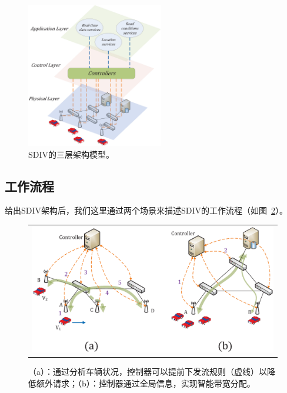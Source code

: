 \begin{figure} [t]
\begin{center}
\includegraphics[width=0.9\columnwidth,height=2.5in]{figures/fig-2-24.eps}
\vspace{-0.2in}
\caption{SDIV的三层架构模型。} \label{fig2}
\end{center}
\vspace{-0.3in}
\end{figure}

\subsection{工作流程}

给出SDIV架构后，我们这里通过两个场景来描述SDIV的工作流程（如图~\ref{fig3}）。



\begin{figure} [t]
\begin{center}
\begin{tabular}{c}
\includegraphics[width=1\columnwidth]{figures/fig-3-29.eps} \\
\end{tabular}
\caption{（a）：通过分析车辆状况，控制器可以提前下发流规则（虚线）以降低额外请求；（b）：控制器通过全局信息，实现智能带宽分配。} \label{fig3}
  \end{center}
  \vspace{-0.3in}
\end{figure}

